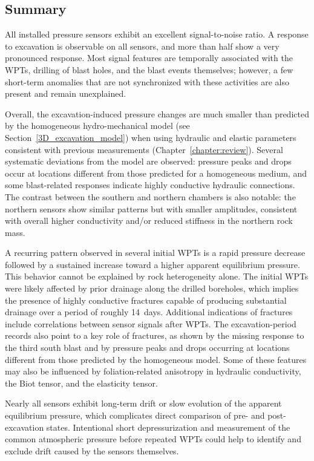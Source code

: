 \subsection{Summary}
All installed pressure sensors exhibit an excellent signal-to-noise ratio. A response
to excavation is observable on all sensors, and more than half show a very pronounced
response. Most signal features are temporally associated with the WPTs, drilling of
blast holes, and the blast events themselves; however, a few short-term anomalies
that are not synchronized with these activities are also present and remain
unexplained.

Overall, the excavation-induced pressure changes are much smaller than predicted by
the homogeneous hydro-mechanical model (see Section~\ref{3D_excavation_model}) when using hydraulic
and elastic parameters consistent with previous measurements (Chapter~\ref{chapter:review}).
Several systematic deviations from the model are observed: pressure peaks and drops
occur at locations different from those predicted for a homogeneous medium, and some
blast-related responses indicate highly conductive hydraulic connections. The contrast
between the southern and northern chambers is also notable: the northern sensors show
similar patterns but with smaller amplitudes, consistent with overall higher
conductivity and/or reduced stiffness in the northern rock mass.

A recurring pattern observed in several initial WPTs is a rapid pressure decrease
followed by a sustained increase toward a higher apparent equilibrium pressure.
This behavior cannot be explained by rock heterogeneity alone. The initial WPTs were
likely affected by prior drainage along the drilled boreholes, which implies the
presence of highly conductive fractures capable of producing substantial drainage
over a period of roughly 14~days. Additional indications of fractures include
correlations between sensor signals after WPTs. The excavation-period records also
point to a key role of fractures, as shown by the missing response to the third south
blast and by pressure peaks and drops occurring at locations different from those
predicted by the homogeneous model. Some of these features may also be influenced by
foliation-related anisotropy in hydraulic conductivity, the Biot tensor, and the
elasticity tensor.

Nearly all sensors exhibit long-term drift or slow evolution of the apparent
equilibrium pressure, which complicates direct comparison of pre- and
post-excavation states. Intentional short depressurization and measurement of the
common atmospheric pressure before repeated WPTs could help to identify and exclude
drift caused by the sensors themselves.

